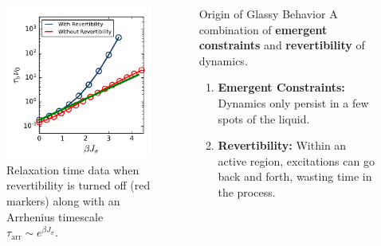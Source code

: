 \documentclass[9pt,professionalfont,t,aspectratio=169]{beamer}
\begin{document}
\begin{frame}
\begin{columns}[T]
\begin{column}[T]{0.6\textwidth}
\begin{figure}[t]
\begin{overprint}
\centering\includegraphics[height=0.7\textheight]{d.1-fac_intro/taubwithirrev.pdf}\caption{Relaxation time data when revertibility is turned off (red markers) along with an Arrhenius timescale $\tau_\mathrm{arr} \sim e^{\beta J_\sigma}$.}

\end{overprint}

\end{figure}
\end{column}

\begin{column}[t]{0.4\textwidth}

\begin{block}{\centering Origin of Glassy Behavior}
\centering A combination of \textbf{emergent constraints} and \textbf{revertibility} of dynamics. 
\end{block}

\begin{enumerate}
   \item<2-> \textbf{Emergent Constraints:} Dynamics only persist in a few spots of the liquid. 
   \item<3-> \textbf{Revertibility:} Within an active region, excitations can go back and forth, wasting time in the process. 
\end{enumerate}

\end{column}

\end{columns}

\end{frame}
\end{document}
